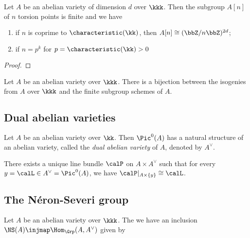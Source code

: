     \begin{theorem}\label{thm: torsion subgroups of abelian varieties}
        Let \(A\) be an abelian variety of dimension \(d\) over \(\kkk\). 
        Then the subgroup \(A[n]\) of \(n\) torsion points is finite and we have 
        \begin{enumerate}
            \item if \(n\) is coprime to \(\characteristic(\kk)\), then \(A[n] \cong (\bbZ/n\bbZ)^{2d}\);
            \item if \(n = p^k\) for \(p = \characteristic(\kk) > 0\)
        \end{enumerate}
    \end{theorem}
    \begin{proof}
    \end{proof}

    \begin{theorem}\label{thm:isogenies_and_finite_subgroups}
        Let \(A\) be an abelian variety over \(\kkk\). 
        There is a bijection between the isogenies from \(A\) over \(\kkk\) and the finite subgroup schemes of \(A\).
    \end{theorem}


\subsection{Dual abelian varieties}

    \begin{theorem}\label{thm: dual abelian varieties}
        Let $A$ be an abelian variety over $\kk$. 
        Then \(\Pic^0(A) \) has a natural structure of an abelian variety, called the \emph{dual abelian variety} of $A$, denoted by $A^\vee$.
    \end{theorem}

    \begin{proposition}\label{prop: the Poincare line bundle}
        There exists a unique line bundle \(\calP\) on \(A \times A^\vee\) such that for every \(y = \calL \in A^\vee = \Pic^0(A)\), we have \(\calP|_{A \times \{y\}} \cong \calL\).
    \end{proposition}


\subsection{The N\'eron-Severi group}


    \begin{theorem}\label{thm:NS_A_as_homomorphisms_from_A_to_A_dual}
        Let \(A\) be an abelian variety over \(\kkk\).
        The we have an inclusion \(\NS(A) \injmap \Hom_{\Grp}(A, A^\vee)\) given by 
    \end{theorem}